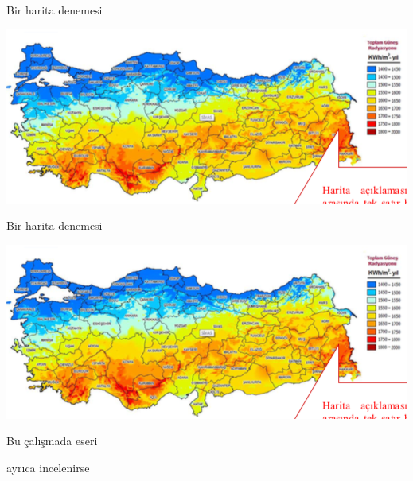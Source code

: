 \documentclass[
oneside, %
doktora, %
]{aufbetez} %
\begin{document}
\begin{thesismap}{Bir harita denemesi}
	\begin{center}
		\includegraphics[scale=0.75]{harita}
	\end{center}
\end{thesismap}

\lipsum

\begin{thesismap}{Bir harita denemesi}
	\begin{center}
		\includegraphics[scale=0.75]{harita}
	\end{center}
\end{thesismap}

Bu çalışmada \cite{lamport94} eseri \lipsum[2]

 ayrıca \cite[s.~123]{lamport94} incelenirse \lipsum[50]













\backmatter%





\end{document}
